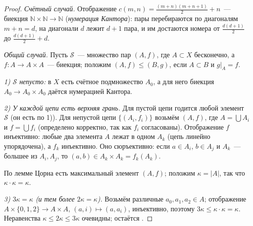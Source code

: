 \begin{proof}
\emph{Счётный случай.} Отображение $c(m,n)=\frac{(m+n)(m+n+1)}2+n$~--- биекция $\mathbb N\times\mathbb N\to\mathbb N$
(\emph{нумерация Кантора}): пары перебираются по диагоналям $m+n=d$, на диагонали $d$ лежит $d+1$ пара, и им достаются
номера от $\frac{d(d+1)}2$ до $\frac{d(d+1)}2+d$.

\begin{center}
\end{center}

\emph{Общий случай.} Пусть $\mathcal S$~--- множество пар $(A,f)$, где $A\subset X$ бесконечно, а
$f\colon A\to A\times A$~--- биекция; положим $(A,f)\le(B,g)$, если $A\subset B$ и $g|_A=f$.

\emph{1) $\mathcal S$ непусто:} в $X$ есть счётное подмножество $A_0$, а для него биекция $A_0\to A_0\times A_0$ даётся
нумерацией Кантора.

\emph{2) У каждой цепи есть верхняя грань.} Для пустой цепи годится любой элемент $\mathcal S$ (он есть по 1)). Для
непустой цепи $\{(A_i,f_i)\}$ возьмём $(A,f)$, где $A=\bigcup A_i$ и $f=\bigcup f_i$ (определено
корректно, так как $f_i$ согласованы). Отображение $f$ инъективно: любые два элемента $A$ лежат в одном $A_k$ (цепь
линейно упорядочена), а $f_k$ инъективно. Оно сюръективно: если $a\in A_i$, $b\in A_j$ и $A_k$~--- большее из
$A_i,A_j$, то $(a,b)\in A_k\times A_k=f_k(A_k)$.

По лемме Цорна есть максимальный элемент $(A,f)$; положим $\kappa=|A|$, так что $\kappa\cdot\kappa=\kappa$.

\emph{3) $3\kappa=\kappa$ (и тем более $2\kappa=\kappa$).} Возьмём различные $a_0,a_1,a_2\in A$; отображение
$A\times\{0,1,2\}\to A\times A$, $(a,i)\mapsto(a,a_i)$, инъективно, поэтому $3\kappa\le\kappa\cdot\kappa=\kappa$.
Неравенства $\kappa\le2\kappa\le3\kappa$ очевидны; остаётся .


\end{proof}
